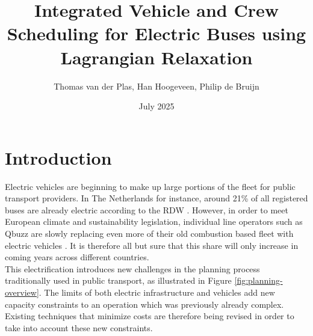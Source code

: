 \documentclass[]{article}
\title{Integrated Vehicle and Crew Scheduling for Electric Buses using Lagrangian Relaxation}
\date{July 2025}
\author{Thomas van der Plas, Han Hoogeveen, Philip de Bruijn}
\begin{document}
\maketitle

\section{Introduction}
Electric vehicles are beginning to make up large portions of the fleet for
public transport providers. In The Netherlands for instance, around 21\% of all
registered buses are already electric according to the RDW \cite{RDW}. However,
in order to meet European climate and sustainability legislation, individual
line operators such as Qbuzz are slowly replacing even more of their old
combustion based fleet with electric vehicles \cite{europaRegulation20181999,
  qbuzzQbuzz}. It is therefore all but sure that this share will only increase in
coming years across different countries. \\ This electrification introduces new
challenges in the planning process traditionally used in public transport, as
illustrated in Figure \ref{fig:planning-overview}. The limits of both electric
infrastructure and vehicles add new capacity constraints to an operation which
was previously already complex. Existing techniques that minimize costs are
therefore being revised in order to take into account these new constraints.
\\\\
\end{document}
